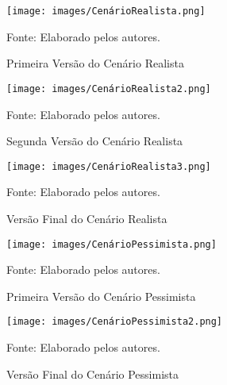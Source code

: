 \documentclass[
    12pt,               %
    openright,          %
    oneside,
    a4paper,            %
    BIBLATEX,           %
    TODO,               %
    english,            %
    brazil              %
    ]{ifsp-spo-inf-ctds}
\begin{document}
            \begin{figure}[H]
                \centering
                 \caption{Primeira Versão do Cenário Realista}
                \texttt{[image: images/CenárioRealista.png]}

                \label{fig:cenariorealistaGrafico1}
                \centering
            \footnotesize Fonte: Elaborado pelos autores.
            \end{figure}

            \begin{figure}[H]
                \centering
                \caption{Segunda Versão do Cenário Realista}
                \texttt{[image: images/CenárioRealista2.png]}

                \label{fig:cenariorealistaGrafico2}
                \centering
            \footnotesize Fonte: Elaborado pelos autores.
            \end{figure}

            \begin{figure}[H]
                \centering
                \caption{Versão Final do Cenário Realista}
                \texttt{[image: images/CenárioRealista3.png]}

                \label{fig:cenariorealistaGrafico3}
                \centering
            \footnotesize Fonte: Elaborado pelos autores.
            \end{figure}

            
            \begin{figure}[H]
                \centering
                \caption{Primeira Versão do Cenário Pessimista}
                \texttt{[image: images/CenárioPessimista.png]}

                \label{fig:cenarioPessimistaGrafico}
                \centering
            \footnotesize Fonte: Elaborado pelos autores.
            \end{figure}

            \begin{figure}[H]
                \centering
                \caption{Versão Final do Cenário Pessimista}
                \texttt{[image: images/CenárioPessimista2.png]}

                \label{fig:cenarioPessimistaGrafico1}
                \centering
            \footnotesize Fonte: Elaborado pelos autores.
            \end{figure}
\end{document}
